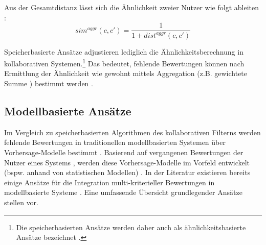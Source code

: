 Aus der Gesamtdistanz lässt sich die Ähnlichkeit zweier Nutzer wie folgt ableiten \cite[S. 858]{adomavicius:4:inbook}:
\begin{equation}\label{eq21}
    sim^{aggr}(c,c') = \frac{1}{1 + dist^{aggr}(c,c')}
\end{equation}

Speicherbasierte Ansätze adjustieren lediglich die Ähnlichkeitsberechnung in kollaborativen Systemen.\footnote{Die speicherbasierten Ansätze werden daher auch als ähnlichkeitsbasierte Ansätze bezeichnet \cite[S. 52]{adomavicius:inproceedings:2}.}
Das bedeutet, fehlende Bewertungen können nach Ermittlung der Ähnlichkeit wie gewohnt mittels Aggregation (z.B. gewichtete Summe \cite[S. 859]{adomavicius:4:inbook}) bestimmt werden \cite[S. 52]{adomavicius:inproceedings:2}\cite[S. 428]{recommenderSystems:2016}.

\subsection{Modellbasierte Ansätze}
Im Vergleich zu speicherbasierten Algorithmen des kollaborativen Filterns werden fehlende Bewertungen in traditionellen modellbasierten Systemen über Vorhersage-Modelle bestimmt \cite[S. 861]{recommenderSystems:2016}.
Basierend auf vergangenen Bewertungen der Nutzer eines Systems \cite[S. 358]{jin:article}, werden diese Vorhersage-Modelle im Vorfeld entwickelt (bspw. anhand von statistischen Modellen) \cite[S. 71]{recommenderSystems:2016}.
In der Literatur existieren bereits einige Ansätze für die Integration multi-kriterieller Bewertungen in modellbasierte Systeme \cite[S. 861]{adomavicius:4:inbook}.
Eine umfassende Übersicht grundlegender Ansätze stellen \textcite[S. 861]{adomavicius:4:inbook} vor.

